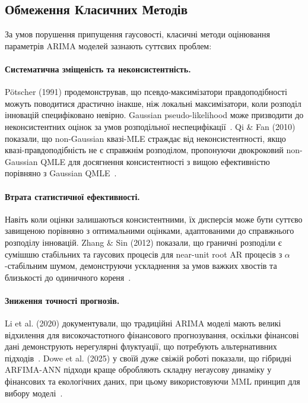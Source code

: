 \documentclass[12pt,a4paper]{article}
\begin{document}
\subsection{Обмеження Класичних Методів}
\label{subsec:classic_limitations}
	
	За умов порушення припущення гаусовості, класичні методи оцінювання параметрів ARIMA моделей зазнають суттєвих проблем:
	
	\paragraph{Систематична зміщеність та неконсистентність.} Pötscher (1991) продемонстрував, що псевдо-максимізатори правдоподібності можуть поводитися драстично інакше, ніж локальні максимізатори, коли розподіл інновацій специфіковано невірно. Gaussian pseudo-likelihood може призводити до неконсистентних оцінок за умов розподільної неспецифікації~\cite{potscher1991noninvertibility}. Qi \& Fan (2010) показали, що non-Gaussian квазі-MLE страждає від неконсистентності, якщо квазі-правдоподібність не є справжнім розподілом, пропонуючи двокроковий non-Gaussian QMLE для досягнення консистентності з вищою ефективністю порівняно з Gaussian QMLE~\cite{qi2010non}.
	
	\paragraph{Втрата статистичної ефективності.} Навіть коли оцінки залишаються консистентними, їх дисперсія може бути суттєво завищеною порівняно з оптимальними оцінками, адаптованими до справжнього розподілу інновацій. Zhang \& Sin (2012) показали, що граничні розподіли є сумішшю стабільних та гаусових процесів для near-unit root AR процесів з $\alpha$-стабільним шумом, демонструючи ускладнення за умов важких хвостів та близькості до одиничного кореня~\cite{zhang2012maximum}.
	
	\paragraph{Зниження точності прогнозів.} Li et al. (2020) документували, що традиційні ARIMA моделі мають великі відхилення для високочастотного фінансового прогнозування, оскільки фінансові дані демонструють нерегулярні флуктуації, що потребують альтернативних підходів~\cite{li2020forecasting}. Dowe et al. (2025) у своїй дуже свіжій роботі показали, що гібридні ARFIMA-ANN підходи краще обробляють складну негаусову динаміку у фінансових та екологічних даних, при цьому використовуючи MML принцип для вибору моделі~\cite{dowe2025novel}.
	
\end{document}
